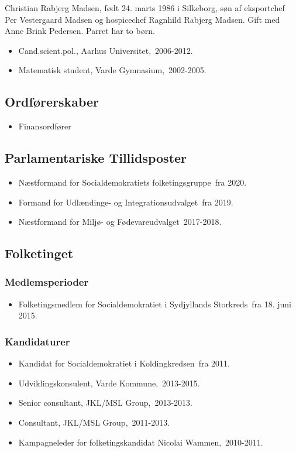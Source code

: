 \documentclass[11pt, a4paper]{awesome-cv}
\begin{document}
\makecvheader[R]
\makelettertitle
\begin{cvletter}
Christian Rabjerg Madsen, født 24. marts 1986 i Silkeborg, søn af eksportchef Per Vestergaard Madsen og hospicechef Ragnhild Rabjerg Madsen. Gift med Anne Brink Pedersen. Parret har to børn. 

\begin{itemize}
\item Cand.scient.pol., Aarhus Universitet, 2006-2012.
\item Matematisk student, Varde Gymnasium, 2002-2005.
\end{itemize}
\subsection*{Ordførerskaber}
\begin{itemize}
\item Finansordfører
\end{itemize}
\subsection*{Parlamentariske Tillidsposter}
\begin{itemize}
\item Næstformand for Socialdemokratiets folketingsgruppe fra 2020.
\item Formand for Udlændinge- og Integrationsudvalget fra 2019.
\item Næstformand for Miljø- og Fødevareudvalget 2017-2018.
\end{itemize}
\subsection*{Folketinget}
\subsubsection*{Medlemsperioder}
\begin{itemize}
\item Folketingsmedlem for Socialdemokratiet i Sydjyllands Storkreds fra 18. juni 2015.
\end{itemize}
\subsubsection*{Kandidaturer}
\begin{itemize}
\item Kandidat for Socialdemokratiet i Koldingkredsen fra 2011.
\end{itemize}
\begin{itemize}
\item Udviklingskonsulent, Varde Kommune, 2013-2015.
\item Senior consultant, JKL/MSL Group, 2013-2013.
\item Consultant, JKL/MSL Group, 2011-2013.
\item Kampagneleder for folketingskandidat Nicolai Wammen, 2010-2011.
\end{itemize}
\end{cvletter}
\end{document}
